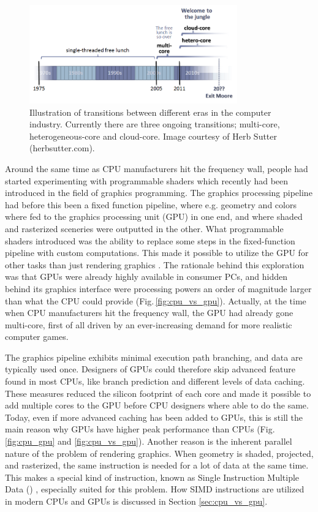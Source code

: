 \begin{figure}
\centering
\includegraphics[width=0.8\textwidth]{img/free_lunsh.png}
\caption{Illustration of transitions between different eras in the computer industry. Currently there are three ongoing transitions; multi-core, heterogeneous-core and cloud-core. Image courtesy of Herb Sutter (herbsutter.com).}
\label{fig:jungle}
\end{figure}

Around the same time as CPU manufacturers hit the frequency wall, people had started experimenting with programmable shaders which recently had been introduced in the field of graphics programming. The graphics processing pipeline had before this been a fixed function pipeline, where e.g. geometry and colors where fed to the graphics processing unit (GPU) in one end, and where shaded and rasterized sceneries were outputted in the other. What programmable shaders  introduced was the ability to replace some steps in the fixed-function pipeline with custom computations. This made it possible to utilize the GPU for other tasks than just rendering graphics \cite{Seland2007}. The rationale behind this exploration was that GPUs were already highly available in consumer PCs, and hidden behind its graphics interface were processing powers an order of magnitude larger than what the CPU could provide (Fig.\,\ref{fig:cpu_vs_gpu}). Actually, at the time when CPU manufacturers hit the frequency wall, the GPU had already gone multi-core, first of all driven by an ever-increasing demand for more realistic computer games. 

The graphics pipeline exhibits minimal execution path branching, and data are typically used once. Designers of GPUs could therefore skip advanced feature found in most CPUs, like branch prediction and different levels of data caching. These measures reduced the silicon footprint of each core and made it possible to add multiple cores to the GPU before CPU designers where able to do the same. Today, even if more advanced caching has been added to GPUs, this is still the main reason why GPUs have higher peak performance than CPUs (Fig.\,\ref{fig:cpu_gpu} and \ref{fig:cpu_vs_gpu}). Another reason is the inherent parallel nature of the problem of rendering graphics. When geometry is shaded, projected, and rasterized, the same instruction is needed for a lot of data at the same time. This makes a special kind of instruction, known as Single Instruction Multiple Data () \cite{Flynn1966}, especially suited for this problem. How SIMD instructions are utilized in modern CPUs and GPUs is discussed in Section \ref{sec:cpu_vs_gpu}.

